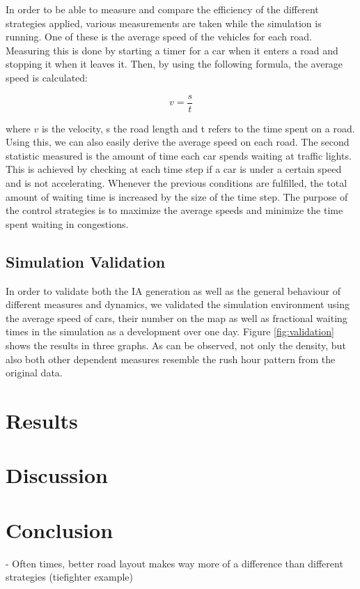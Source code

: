 \documentclass[10pt]{article}
\begin{document}
In order to be able to measure and compare the efficiency of the different strategies applied, various measurements are taken while the simulation is running. One of these is the average speed of the vehicles for each road. Measuring this is done by starting a timer for a car when it enters a road and stopping it when it leaves it. Then, by using the following formula, the average speed is calculated:   

\begin{equation}
	v = \frac{s}{t}
\end{equation}

where $v$ is the velocity, s the road length and t refers to the time spent on a road. Using this, we can also easily derive the average speed on each road. The second statistic measured is the amount of time each car spends waiting at traffic lights. This is achieved by checking at each time step if a car is under a certain speed and is not accelerating. Whenever the previous conditions are fulfilled, the total amount of waiting time is increased by the size of the time step. The purpose of the control strategies is to maximize the average speeds and minimize the time spent waiting in congestions.

\subsection{Simulation Validation}
In order to validate both the IA generation as well as the general behaviour of different measures and dynamics, we validated the simulation environment using the average speed of cars, their number on the map as well as fractional waiting times in the simulation as a development over one day. Figure \ref{fig:validation} shows the results in three graphs. As can be observed, not only the density, but also both other dependent measures resemble the rush hour pattern from the original data.

\section{Results}
\label{sec:results}

\section{Discussion}
\label{sec:discussion}

\section{Conclusion}
\label{sec:conclusion}

- Often times, better road layout makes way more of a difference than different strategies (tiefighter example)

{\tiny\printbibliography}
\end{document}
